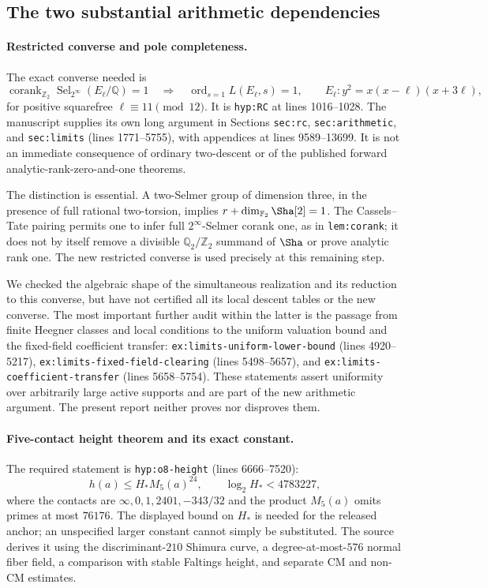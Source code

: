 \subsection{The two substantial arithmetic dependencies}

\paragraph{Restricted converse and pole completeness.}
The exact converse needed is
\[
 \operatorname{corank}_{\mathbb Z_2}
  \operatorname{Sel}_{2^\infty}(E_\ell/\mathbb Q)=1
 \quad\Longrightarrow\quad
 \operatorname{ord}_{s=1}L(E_\ell,s)=1,
 \qquad E_\ell:y^2=x(x-\ell)(x+3\ell),
\]
for positive squarefree $\ell\equiv11\pmod{12}$.
It is \texttt{hyp:RC} at lines 1016--1028.  The manuscript supplies
its own long argument in Sections \texttt{sec:rc},
\texttt{sec:arithmetic}, and \texttt{sec:limits} (lines 1771--5755),
with appendices at lines 9589--13699.  It is not an immediate
consequence of ordinary two-descent or of the published forward
analytic-rank-zero-and-one theorems.

The distinction is essential.  A two-Selmer group of dimension three,
in the presence of full rational two-torsion, implies
$r+\dim_{\mathbb F_2}\Sha[2]=1$.  The Cassels--Tate pairing permits
one to infer full $2^\infty$-Selmer corank one, as in
\texttt{lem:corank}; it does not by itself remove a divisible
$\mathbb Q_2/\mathbb Z_2$ summand of $\Sha$ or prove analytic rank one.
The new restricted converse is used precisely at this remaining step.

We checked the algebraic shape of the simultaneous realization and
its reduction to this converse, but have not certified all its local
descent tables or the new converse.  The most important further audit
within the latter is the passage from finite Heegner classes and local
conditions to the uniform valuation bound and the fixed-field
coefficient transfer:
\texttt{ex:limits-uniform-lower-bound} (lines 4920--5217),
\texttt{ex:limits-fixed-field-clearing} (lines 5498--5657), and
\texttt{ex:limits-coefficient-transfer} (lines 5658--5754).
These statements assert uniformity over arbitrarily large active
supports and are part of the new arithmetic argument.  The present
report neither proves nor disproves them.

\paragraph{Five-contact height theorem and its exact constant.}
The required statement is \texttt{hyp:o8-height}
(lines 6666--7520):
\[
 h(a)\le H_*M_5(a)^{24},\qquad \log_2H_*<4783227,
\]
where the contacts are $\infty,0,1,2401,-343/32$ and the product
$M_5(a)$ omits primes at most $76176$.
The displayed bound on $H_*$ is needed for the released anchor;
an unspecified larger constant cannot simply be substituted.
The source derives it using the discriminant-$210$ Shimura curve,
a degree-at-most-$576$ normal fiber field, a comparison with stable
Faltings height, and separate CM and non-CM estimates.

